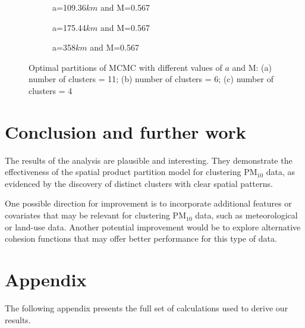 \documentclass[12pt,a4paper]{article}
\begin{document}
\begin{figure}[]
\centering
\begin{subfigure}{.5\textwidth}
  \centering
  
  \caption{a=109.36$km$ and M=0.567}
  \label{fig2:sub1}
\end{subfigure}%
\begin{subfigure}{.5\textwidth}
  \centering
  
  \caption{a=175.44$km$ and  M=0.567}
  \label{fig2:sub2}
\end{subfigure}
\begin{subfigure}{.5\textwidth}
  \centering
  
  \caption{a=358$km$ and M=0.567}
  \label{fig2:sub3}
\end{subfigure}
\caption{Optimal partitions of MCMC with different values of $a$ and M: (a) number of clusters = 11; (b) number of clusters = 6; (c) number of clusters = 4}
\label{fig2}
\end{figure}

\newpage

\section{Conclusion and further work}


The results of the analysis are plausible and interesting. They demonstrate the effectiveness of the spatial product partition model for clustering PM$_{10}$ data, as evidenced by the discovery of distinct clusters with clear spatial patterns. 

One possible direction for improvement is to incorporate additional features or covariates that may be relevant for clustering PM$_{10}$ data, such as meteorological or land-use data. Another potential improvement would be to explore alternative cohesion functions that may offer better performance for this type of data. 




\newpage

\section{Appendix}

The following appendix presents the full set of calculations used to derive our results.
\end{document}
